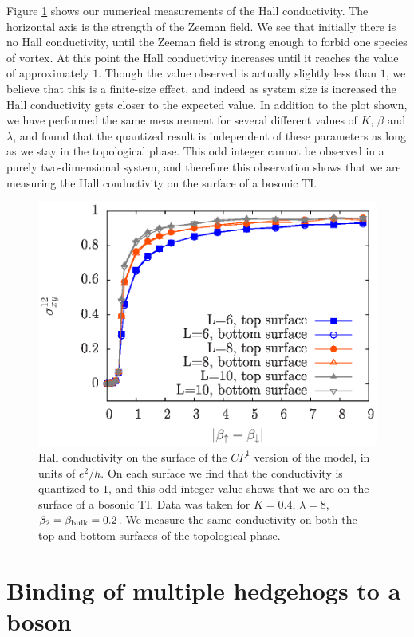 \documentclass[prb,twocolumn]{revtex4-1}
\begin{document}
Figure \ref{cp1hall} shows our numerical measurements of the Hall conductivity. The horizontal axis is the strength of the Zeeman field. We see that initially there is no Hall conductivity, until the Zeeman field is strong enough to forbid one species of vortex. At this point the Hall conductivity increases until it reaches the value of approximately $1$. Though the value observed is actually slightly less than $1$, we believe that this is a finite-size effect, and indeed as system size is increased the Hall conductivity gets closer to the expected value. In addition to the plot shown, we have performed the same measurement for several different values of $K$, $\beta$ and $\lambda$, and found that the quantized result is independent of these parameters as long as we stay in the topological phase. This odd integer cannot be observed in a purely two-dimensional system, and therefore this observation shows that we are measuring the Hall conductivity on the surface of a bosonic TI.

\begin{figure}
\includegraphics[angle=-90,width=0.9\linewidth]{figures/cp1hall.eps}
\caption{Hall conductivity on the surface of the $CP^1$ version of the model, in units of $e^2/h$. On each surface we find that the conductivity is quantized to $1$, and this odd-integer value shows that we are on the surface of a bosonic TI. Data was taken for $K=0.4$, $\lambda=8$, $\beta_2=\beta_{\rm bulk}=0.2$. We measure the same conductivity on both the top and bottom surfaces of the topological phase.}
\label{cp1hall}
\end{figure}

\section{Binding of multiple hedgehogs to a boson}
\label{section::multiple}
\end{document}
